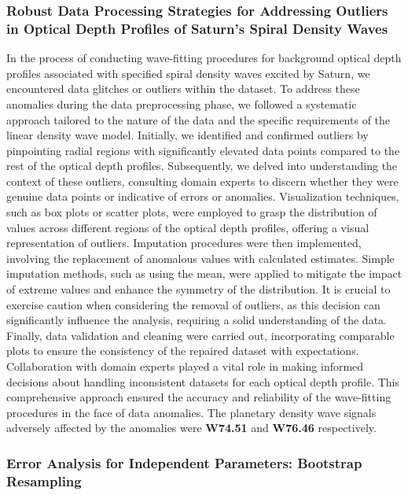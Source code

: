 \documentclass{article}
\begin{document}
\subsubsection{Robust Data Processing Strategies for Addressing Outliers in Optical Depth Profiles of Saturn's Spiral Density Waves}
In the process of conducting wave-fitting procedures for background optical depth profiles associated with specified spiral density waves excited by Saturn, we encountered data glitches or outliers within the dataset. To address these anomalies during the data preprocessing phase, we followed a systematic approach tailored to the nature of the data and the specific requirements of the linear density wave model. Initially, we identified and confirmed outliers by pinpointing radial regions with significantly elevated data points compared to the rest of the optical depth profiles. Subsequently, we delved into understanding the context of these outliers, consulting domain experts to discern whether they were genuine data points or indicative of errors or anomalies. Visualization techniques, such as box plots or scatter plots, were employed to grasp the distribution of values across different regions of the optical depth profiles, offering a visual representation of outliers. Imputation procedures were then implemented, involving the replacement of anomalous values with calculated estimates. Simple imputation methods, such as using the mean, were applied to mitigate the impact of extreme values and enhance the symmetry of the distribution. It is crucial to exercise caution when considering the removal of outliers, as this decision can significantly influence the analysis, requiring a solid understanding of the data. Finally, data validation and cleaning were carried out, incorporating comparable plots to ensure the consistency of the repaired dataset with expectations. Collaboration with domain experts played a vital role in making informed decisions about handling inconsistent datasets for each optical depth profile. This comprehensive approach ensured the accuracy and reliability of the wave-fitting procedures in the face of data anomalies. The planetary density wave signals adversely affected by the anomalies were \textbf{W74.51} and \textbf{W76.46} respectively. 
\subsubsection{Error Analysis for Independent Parameters: Bootstrap Resampling}
\end{document}
